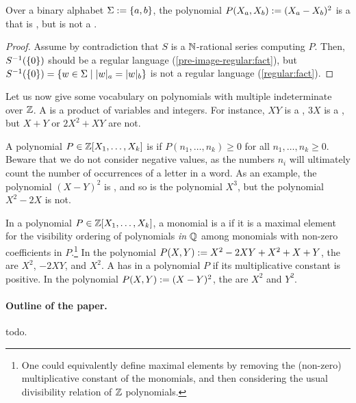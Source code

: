 \documentclass[sigconf,natbib=false,screen, review,anonymous]{acmart}
\begin{document}
\begin{example}
    Over a binary alphabet $\Sigma \mathrel{:=} \mathopen{\{} a,b \mathclose{\}}$,
    the polynomial $P(X_a, X_b) \mathrel{:=} (X_a - X_b)^2$
    is a  that is ,
    but is
    not a .
\end{example}
\begin{proof}
    Assume by contradiction that
    $S$ is a $\mathbb{N}$-rational series computing $P$.
    Then, $S^{-1}(\mathopen{\{} 0 \mathclose{\}})$ should be a regular language
    (\cref{pre-image-regular:fact}),
    but $S^{-1}(\set{0}) = \setof{ w \in \Sigma }{ \card[a]{w} = \card[b]{w} }$
    is not a regular language (\cref{regular:fact}).
\end{proof}


\AP Let us now give some vocabulary on polynomials with multiple indeterminate
over $\mathbb{Z}$. A  is a product of variables and integers. For
instance, $XY$ is a , $3 X$ is a , but $X + Y$ or
$2X^2 + XY$ are not.

\AP A polynomial $P \in \mathbb{Z}[X_1, \dots, X_k]$ is  if
$P(n_1, \dots, n_k) \geq 0$ for all $n_1, \dots, n_k \geq 0$. Beware that we do
not consider negative values, as the numbers $n_i$ will ultimately count the
number of occurrences of a letter in a word. As an example, the polynomial $(X
- Y)^2$ is , and so is the polynomial $X^3$, but the
polynomial $X^2 - 2X$ is not.

\AP
In a polynomial $P \in \mathbb{Z}[X_1, \dots, X_k]$, a monomial 
is a  if it is a maximal element
for the visibility ordering of polynomials \emph{in $\mathbb{Q}$}
among monomials with non-zero coefficients in $P$.\footnote{
    One could equivalently define maximal elements by removing the (non-zero)
    multiplicative constant of the monomials, and then
    considering the usual divisibility relation of $\mathbb{Z}$ polynomials.
}
In the polynomial 
$P(X,Y) \mathrel{:=} X^2 - 2XY + X^2 + X + Y$, the 
are $X^2$, $-2 XY$, and $X^2$.
A  has  in a polynomial $P$ if its
multiplicative constant is positive. In the polynomial $P(X,Y) \mathrel{:=} (X -
Y)^2$, the  are $X^2$ and $Y^2$.


\paragraph*{Outline of the paper.}
todo.
\end{document}
